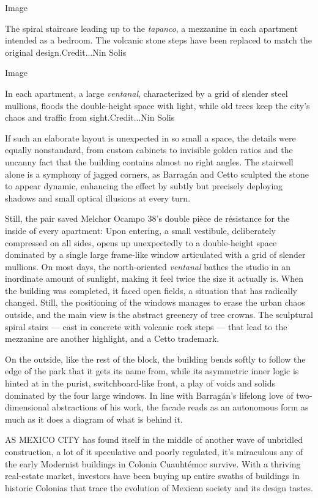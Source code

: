 Image

The spiral staircase leading up to the \emph{tapanco}, a mezzanine in
each apartment intended as a bedroom. The volcanic stone steps have been
replaced to match the original design.Credit...Nin Solis

Image

In each apartment, a large \emph{ventanal}, characterized by a grid of
slender steel mullions, floods the double-height space with light, while
old trees keep the city's chaos and traffic from sight.Credit...Nin
Solis

If such an elaborate layout is unexpected in so small a space, the
details were equally nonstandard, from custom cabinets to invisible
golden ratios and the uncanny fact that the building contains almost no
right angles. The stairwell alone is a symphony of jagged corners, as
Barragán and Cetto sculpted the stone to appear dynamic, enhancing the
effect by subtly but precisely deploying shadows and small optical
illusions at every turn.

Still, the pair saved Melchor Ocampo 38's double pièce de résistance for
the inside of every apartment: Upon entering, a small vestibule,
deliberately compressed on all sides, opens up unexpectedly to a
double-height space dominated by a single large frame-like window
articulated with a grid of slender mullions. On most days, the
north-oriented \emph{ventanal} bathes the studio in an inordinate amount
of sunlight, making it feel twice the size it actually is. When the
building was completed, it faced open fields, a situation that has
radically changed. Still, the positioning of the windows manages to
erase the urban chaos outside, and the main view is the abstract
greenery of tree crowns. The sculptural spiral stairs --- cast in
concrete with volcanic rock steps --- that lead to the mezzanine are
another highlight, and a Cetto trademark.

On the outside, like the rest of the block, the building bends softly to
follow the edge of the park that it gets its name from, while its
asymmetric inner logic is hinted at in the purist, switchboard-like
front, a play of voids and solids dominated by the four large windows.
In line with Barragán's lifelong love of two-dimensional abstractions of
his work, the facade reads as an autonomous form as much as it does a
diagram of what is behind it.

AS MEXICO CITY has found itself in the middle of another wave of
unbridled construction, a lot of it speculative and poorly regulated,
it's miraculous any of the early Modernist buildings in Colonia
Cuauhtémoc survive. With a thriving real-estate market, investors have
been buying up entire swaths of buildings in historic Colonias that
trace the evolution of Mexican society and its design tastes.

